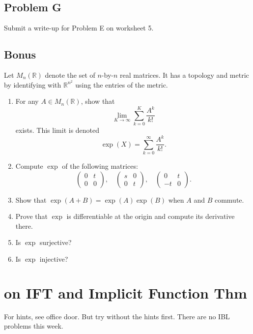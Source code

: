 \documentclass[lang=cn,11pt]{template}
\begin{document}
\section*{Problem G}
Submit a write-up for Problem E on worksheet 5.

\section*{Bonus}
Let $M_n(\mathbb{R})$ denote the set of $n$-by-$n$ real matrices. It has a topology and metric by identifying with $\mathbb{R}^{n^2}$ using the entries of the metric.
\begin{enumerate}
    \item For any $A \in M_n(\mathbb{R})$, show that
    \[
    \lim_{K \to \infty} \sum_{k=0}^K \frac{A^k}{k!}
    \]
    exists. This limit is denoted
    \[
    \exp(X) = \sum_{k=0}^\infty \frac{A^k}{k!}.
    \]
    \item Compute $\exp$ of the following matrices:
    \[
    \begin{pmatrix} 0 & t \\ 0 & 0 \end{pmatrix}, \quad \begin{pmatrix} s & 0 \\ 0 & t \end{pmatrix}, \quad \begin{pmatrix} 0 & t \\ -t & 0 \end{pmatrix}.
    \]
    \item Show that $\exp(A + B) = \exp(A)\exp(B)$ when $A$ and $B$ commute.
    \item Prove that $\exp$ is differentiable at the origin and compute its derivative there.
    \item Is $\exp$ surjective?
    \item Is $\exp$ injective?
\end{enumerate}









\chapter{on IFT and Implicit Function Thm}

For hints, see office door. But try without the hints first. There are no IBL problems this week.
\end{document}
